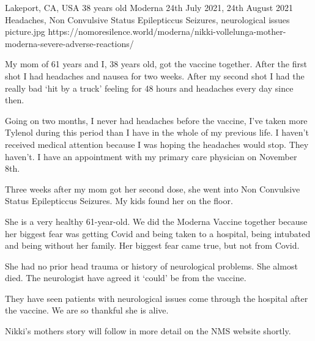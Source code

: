{Lakeport, CA, USA}
{38 years old}
{Moderna}
{24th July 2021, 24th August 2021}
{Headaches, Non Convulsive Status Epilepticcus Seizures, neurological issues}
{picture.jpg}
{https://nomoresilence.world/moderna/nikki-vollelunga-mother-moderna-severe-adverse-reactions/}
{

My mom of 61 years and I, 38 years old, got the vaccine together. After the
first shot I had headaches and nausea for two weeks. After my second shot I had
the really bad ‘hit by a truck’ feeling for 48 hours and headaches every day
since then.

Going on two months, I never had headaches before the vaccine, I’ve taken more
Tylenol during this period than I have in the whole of my previous life. I
haven’t received medical attention because I was hoping the headaches would
stop. They haven’t. I have an appointment with my primary care physician on
November 8th.

Three weeks after my mom got her second dose, she went into Non Convulsive
Status Epilepticcus Seizures. My kids found her on the floor.

She is a very healthy 61-year-old. We did the Moderna Vaccine together because
her biggest fear was getting Covid and being taken to a hospital, being
intubated and being without her family. Her biggest fear came true, but not from
Covid.

She had no prior head trauma or history of neurological problems. She almost
died. The neurologist have agreed it ‘could’ be from the vaccine.

They have seen patients with neurological issues come through the hospital after
the vaccine. We are so thankful she is alive.

Nikki’s mothers story will follow in more detail on the NMS website shortly.

}
